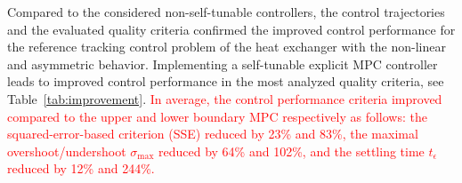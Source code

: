 \documentclass[preprint,12pt]{elsarticle}
\begin{document}
Compared to the considered non-self-tunable controllers, the control trajectories and the evaluated quality criteria confirmed the improved control performance for the reference tracking control problem of the heat exchanger with the non-linear and asymmetric behavior. Implementing a self-tunable explicit MPC controller leads to improved control performance in the most analyzed quality criteria, see Table~\ref{tab:improvement}.	 
\textcolor{red}{In average, the control performance criteria improved compared to the upper and lower boundary MPC respectively as follows: the squared-error-based criterion (SSE) reduced by 23\% and 83\%, the maximal overshoot/undershoot $\sigma_{\mathrm{max}}$ reduced by 64\% and 102\%, and the settling time $t_{\epsilon}$ reduced by 12\% and 244\%.} 



\end{document}
